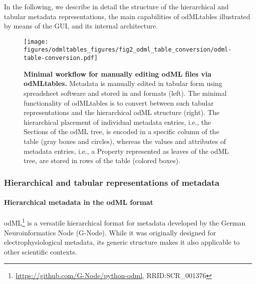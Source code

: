 In the following, we describe in detail the structure of the hierarchical and tabular metadata representations, the main capabilities of odMLtables illustrated by means of the GUI, and its internal architecture. 


\begin{figure}[!ht]
\begin{center}
\texttt{[image: figures/odmltables\_figures/fig2\_odml\_table\_conversion/odml-table-conversion.pdf]}
\caption[Minimal workflow for manually editing odML files via odMLtables]{{\label{fig:min_workflow}
\textbf{Minimal workflow for manually editing odML files via odMLtables.} Metadata is manually edited in tabular form using spreadsheet software and stored in  and  formats (left). The minimal functionality of odMLtables is to convert between such tabular representations and the hierarchical odML structure (right). The hierarchical placement of individual metadata entries, i.e., the Sections of the odML tree, is encoded in a specific column of the table (gray boxes and circles), whereas the values and attributes of metadata entries, i.e., a Property represented as leaves of the odML tree, are stored in rows of the table (colored boxes).%
}}
\end{center}
\end{figure}

\subsubsection{Hierarchical and tabular representations of metadata}
\label{sec:Hierarchical-Tabular}

\paragraph{Hierarchical metadata in the odML format}
\label{sec:subodML}

odML\footnote{\url{https://github.com/G-Node/python-odml}, RRID:SCR\_001376} is a versatile hierarchical format for metadata \citep{Grewe_2011} developed by the German Neuroinformatics Node (G-Node). While it was originally designed for electrophysiological metadata, its generic structure makes it also applicable to other scientific contexts.

